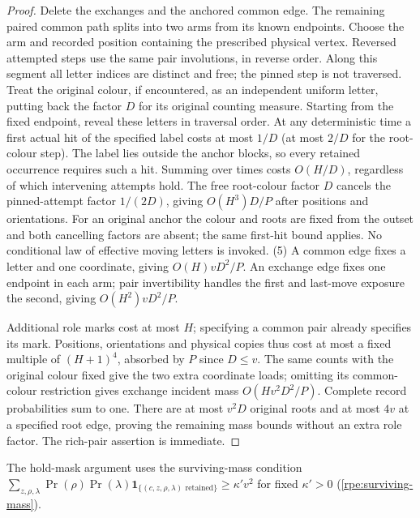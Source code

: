 \begin{proof}
Delete the exchanges and the anchored common edge. The remaining
paired common path splits into two arms from its known endpoints.
Choose the arm and recorded position containing the prescribed
physical vertex. Reversed attempted steps use the same pair
involutions, in reverse order. Along this segment all letter indices
are distinct and free; the pinned step is not traversed. Treat the
original colour, if encountered, as an independent uniform letter,
putting back the factor $D$ for its original counting measure. Starting from the fixed endpoint, reveal these letters in traversal
order. At any deterministic time a first actual hit of the specified
label costs at most $1/D$ (at most $2/D$ for the root-colour step). The label lies outside the anchor blocks, so every retained occurrence
requires such a hit. Summing over times costs $O(H/D)$, regardless of which intervening attempts hold. The free root-colour factor $D$ cancels the pinned-attempt factor $1/(2D)$, giving $O(H^3)D/P$ after positions and orientations. For an original anchor the colour
and roots are fixed from the outset and both cancelling factors are
absent; the same first-hit bound applies. No conditional law of
effective moving letters is invoked.
(5) A common edge fixes a letter and one coordinate, giving $O(H)vD^2/P$. An exchange edge fixes one endpoint in each arm; pair invertibility handles the first and last-move exposure the second,
giving $O(H^2)vD^2/P$.

Additional role marks cost at most $H$; specifying a common pair already specifies its mark. Positions, orientations and physical copies thus
cost at most a fixed multiple of $(H+1)^4$, absorbed by $P$ since $D\le{}v$. The same counts with the original colour fixed give the two extra coordinate loads; omitting its common-colour restriction
gives exchange incident mass $O(Hv^2D^2/P)$. Complete record probabilities sum to one. There are at most $v^2D$ original roots and at most $4v$ at a specified root edge, proving the remaining mass bounds without
an extra role factor. The rich-pair assertion is immediate.
\end{proof}

The hold-mask argument uses the surviving-mass condition $\sum_{z,\rho,\lambda}\Pr(\rho)\Pr(\lambda)\mathbf1_{\{(c,z,\rho,\lambda)\text{ retained}\}}\ge\kappa'v^2$ for fixed $\kappa'>0$ \label{rpe:surviving-mass}\textup{(\ref{rpe:surviving-mass})}.

